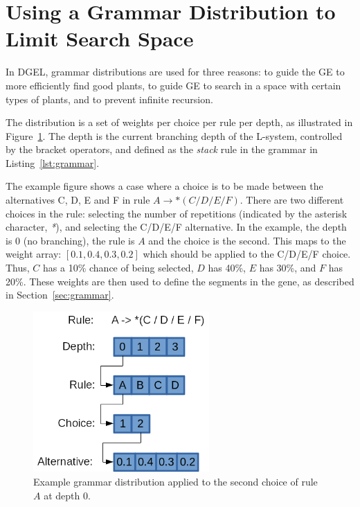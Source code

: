 \section{Using a Grammar Distribution to Limit Search Space}
In DGEL, grammar distributions are used for three reasons: to guide the GE to more efficiently find good plants, to guide GE to search in a space with certain types of plants, and to prevent infinite recursion.

The distribution is a set of weights per choice per rule per depth, as illustrated in Figure~\ref{fig:distribution}.
The depth is the current branching depth of the L-system, controlled by the bracket operators, and defined as the \textit{stack} rule in the grammar in Listing~\ref{lst:grammar}.

The example figure shows a case where a choice is to be made between the alternatives C, D, E and F in rule $A \rightarrow *(C / D / E / F)$.
There are two different choices in the rule: selecting the number of repetitions (indicated by the asterisk character, \textit{*}), and selecting the C/D/E/F alternative.
In the example, the depth is 0 (no branching), the rule is $A$ and the choice is the second.
This maps to the weight array: $[0.1, 0.4, 0.3, 0.2]$ which should be applied to the C/D/E/F choice.
Thus, $C$ has a 10\% chance of being selected, $D$ has 40\%, $E$ has 30\%, and $F$ has 20\%.
These weights are then used to define the segments in the gene, as described in Section~\ref{sec:grammar}.

\begin{figure}
    \centering
    \includegraphics[width=0.6\textwidth]{figures/distribution}
    \caption[Example grammar distribution]{Example grammar distribution applied to the second choice of rule $A$ at depth 0.}
    \label{fig:distribution}
\end{figure}


